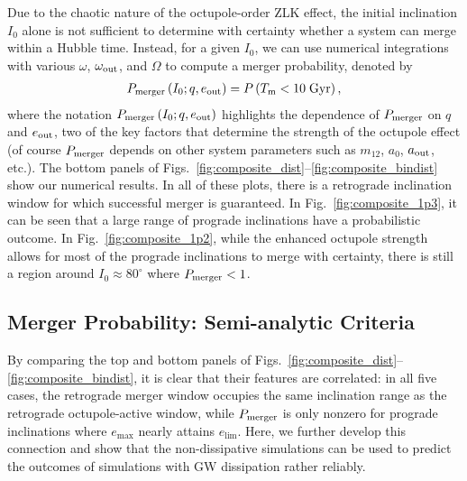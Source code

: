 \documentclass[
        fleqn,
        usenatbib,
    ]{mnras}
\newcommand*{\p}[1]{\left(#1\right)}
\begin{document}
Due to the chaotic nature of the octupole-order ZLK effect, the initial
inclination $I_0$ alone is not sufficient to determine with certainty whether a
system can merge within a Hubble time. Instead, for a given $I_0$, we can use
numerical integrations with various $\omega$, $\omega_{\rm out}$, and $\Omega$
to compute a merger probability, denoted by
\begin{align}
    P_{\rm merger}\p{I_0; q, e_{\rm out}} = P\p{T_{\rm m} < 10\;\mathrm{Gyr}},
        \label{eq:def_pmerge}
\end{align}
where the notation $P_{\rm merger}\p{I_0; q, e_{\rm out}}$ highlights the
dependence of $P_{\rm merger}$ on $q$ and $e_{\rm out}$, two of the key factors
that determine the strength of the octupole effect (of course $P_{\rm merger}$
depends on other system parameters such as $m_{12}$, $a_0$, $a_{\rm out}$,
etc.). The bottom panels of
Figs.~\ref{fig:composite_dist}--\ref{fig:composite_bindist} show our numerical
results. In all of these plots, there is a retrograde inclination window for
which successful merger is guaranteed. In Fig.~\ref{fig:composite_1p3}, it can
be seen that a large range of prograde inclinations have a probabilistic
outcome. In Fig.~\ref{fig:composite_1p2}, while the enhanced octupole strength
allows for most of the prograde inclinations to merge with certainty, there is
still a region around $I_0 \approx 80^\circ$ where $P_{\rm merger} < 1$.

\subsection{Merger Probability: Semi-analytic
Criteria}\label{ss:nogw_merger}

By comparing the top and bottom panels of
Figs.~\ref{fig:composite_dist}--\ref{fig:composite_bindist}, it is clear that
their features are correlated: in all five cases, the retrograde merger window
occupies the same inclination range as the retrograde octupole-active window,
while $P_{\rm merger}$ is only nonzero for prograde inclinations where
$e_{\max}$ nearly attains $e_{\lim}$. Here, we further develop this connection
and show that the non-dissipative simulations can be used to predict the
outcomes of simulations with GW dissipation rather reliably.
\end{document}
